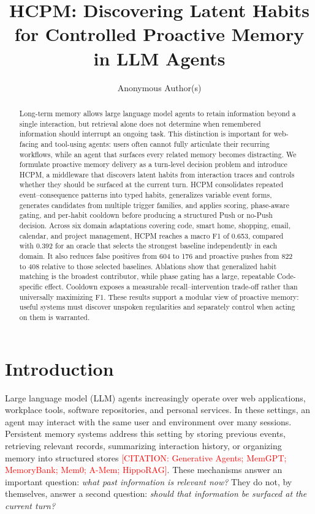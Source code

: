 \documentclass[sigconf,anonymous,review]{acmart}
\title{HCPM: Discovering Latent Habits for Controlled Proactive Memory in LLM Agents}
\author{Anonymous Author(s)}
\affiliation{\institution{Anonymous Institution}}
\newcommand{\citetodo}[1]{\textcolor{red}{[CITATION: #1]}}
\newcommand{\system}{HCPM}
\begin{document}
\begin{abstract}
Long-term memory allows large language model agents to retain information beyond a single interaction, but retrieval alone does not determine when remembered information should interrupt an ongoing task.
This distinction is important for web-facing and tool-using agents: users often cannot fully articulate their recurring workflows, while an agent that surfaces every related memory becomes distracting.
We formulate proactive memory delivery as a turn-level decision problem and introduce \system{}, a middleware that discovers latent habits from interaction traces and controls whether they should be surfaced at the current turn.
\system{} consolidates repeated event--consequence patterns into typed habits, generalizes variable event forms, generates candidates from multiple trigger families, and applies scoring, phase-aware gating, and per-habit cooldown before producing a structured Push or no-Push decision.
Across six domain adaptations covering code, smart home, shopping, email, calendar, and project management, \system{} reaches a macro F1 of 0.653, compared with 0.392 for an oracle that selects the strongest baseline independently in each domain.
It also reduces false positives from 604 to 176 and proactive pushes from 822 to 408 relative to those selected baselines.
Ablations show that generalized habit matching is the broadest contributor, while phase gating has a large, repeatable Code-specific effect.
Cooldown exposes a measurable recall--intervention trade-off rather than universally maximizing F1.
These results support a modular view of proactive memory: useful systems must discover unspoken regularities and separately control when acting on them is warranted.
\end{abstract}


\maketitle

\section{Introduction}

Large language model (LLM) agents increasingly operate over web applications, workplace tools, software repositories, and personal services.
In these settings, an agent may interact with the same user and environment over many sessions.
Persistent memory systems address this setting by storing previous events, retrieving relevant records, summarizing interaction history, or organizing memory into structured stores \citetodo{Generative Agents; MemGPT; MemoryBank; Mem0; A-Mem; HippoRAG}.
These mechanisms answer an important question: \emph{what past information is relevant now?}
They do not, by themselves, answer a second question: \emph{should that information be surfaced at the current turn?}
\end{document}
